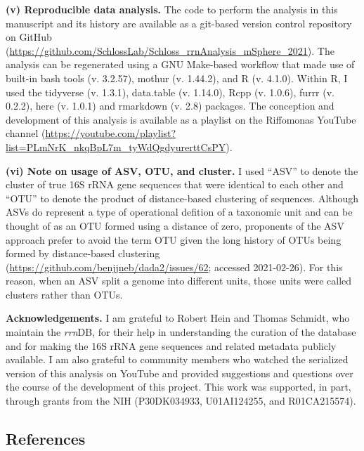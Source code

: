 \documentclass[
]{article}
\begin{document}
\textbf{(v) Reproducible data analysis.} The code to perform the
analysis in this manuscript and its history are available as a git-based
version control repository on GitHub
(\url{https://github.com/SchlossLab/Schloss_rrnAnalysis_mSphere_2021}).
The analysis can be regenerated using a GNU Make-based workflow that
made use of built-in bash tools (v. 3.2.57), mothur (v. 1.44.2), and R
(v. 4.1.0). Within R, I used the tidyverse (v. 1.3.1), data.table (v.
1.14.0), Rcpp (v. 1.0.6), furrr (v. 0.2.2), here (v. 1.0.1) and
rmarkdown (v. 2.8) packages. The conception and development of this
analysis is available as a playlist on the Riffomonas YouTube channel
(\url{https://youtube.com/playlist?list=PLmNrK_nkqBpL7m_tyWdQgdyurerttCsPY}).

\textbf{(vi) Note on usage of ASV, OTU, and cluster.} I used ``ASV'' to
denote the cluster of true 16S rRNA gene sequences that were identical
to each other and ``OTU'' to denote the product of distance-based
clustering of sequences. Although ASVs do represent a type of
operational defition of a taxonomic unit and can be thought of as an OTU
formed using a distance of zero, proponents of the ASV approach prefer
to avoid the term OTU given the long history of OTUs being formed by
distance-based clustering
(\url{https://github.com/benjjneb/dada2/issues/62}; accessed
2021-02-26). For this reason, when an ASV split a genome into different
units, those units were called clusters rather than OTUs.

\vspace{10mm}

\textbf{Acknowledgements.} I am grateful to Robert Hein and Thomas
Schmidt, who maintain the \emph{rrn}DB, for their help in understanding
the curation of the database and for making the 16S rRNA gene sequences
and related metadata publicly available. I am also grateful to community
members who watched the serialized version of this analysis on YouTube
and provided suggestions and questions over the course of the
development of this project. This work was supported, in part, through
grants from the NIH (P30DK034933, U01AI124255, and R01CA215574).

\newpage

\hypertarget{references}{%
\subsection{References}\label{references}}

\setlength{\parindent}{-0.25in}
\setlength{\leftskip}{0.25in}
\end{document}
